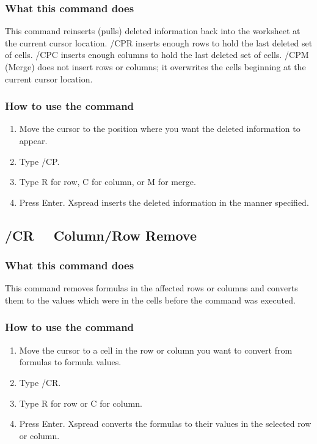 \subsubsection*{What this command does}
This command reinserts (pulls) deleted information back into the 
worksheet at the current cursor location.  /CPR inserts enough rows to 
hold the last deleted set of cells.  /CPC inserts enough columns to 
hold the last deleted set of cells.  /CPM (Merge) does not insert rows 
or columns; it overwrites the cells beginning at the current cursor 
location.

\subsubsection*{How to use the command}
\begin{enumerate}
\item{Move the cursor to the position where you want the deleted
information to appear.}
\item{Type /CP.}
\item{Type R for row, C for column, or M for merge.}
\item{Press Enter.  Xspread inserts the deleted information in the
manner specified.}
\end{enumerate}


\subsection*{/CR \ \     Column/Row Remove}

\subsubsection*{What this command does}
This command removes formulas in the affected rows or columns and 
converts them to the values which were in the cells before the command 
was executed.

\subsubsection*{How to use the command}
\begin{enumerate}
\item{Move the cursor to a cell in the row or column you want to convert
	from formulas to formula values.}
\item{Type /CR.}
\item{Type R for row or C for column.}
\item{Press Enter.  Xspread converts the formulas to their values in the
	selected row or column.}
\end{enumerate}


